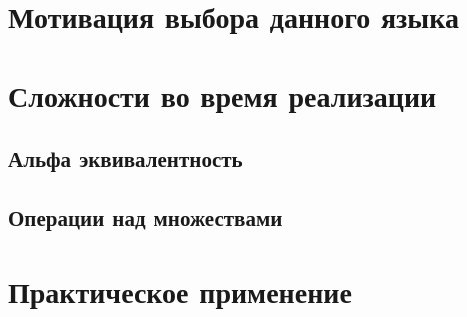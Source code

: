 \documentclass[times,specification,annotation]{itmo-student-thesis}
\begin{document}
\section{Мотивация выбора данного языка}
\todo
\section{Сложности во время реализации}
\todo
\subsection{Альфа эквивалентность}
\todo
\subsection{Операции над множествами}
\todo
\section{Практическое применение}
\todo





\end{document}
